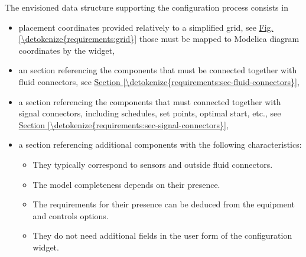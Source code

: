 \documentclass[letterpaper,10pt, openany,english]{sphinxmanual}
\begin{document}
The envisioned data structure supporting the configuration process consists in
\begin{itemize}
\item {} 
placement coordinates provided relatively to a simplified grid, see \hyperref[\detokenize{requirements:grid}]{Fig.\@ \ref{\detokenize{requirements:grid}}} \textendash{} those must be mapped to Modelica diagram coordinates by the widget,

\item {} 
an  section referencing the components that must be connected together with fluid connectors, see \hyperref[\detokenize{requirements:sec-fluid-connectors}]{Section \ref{\detokenize{requirements:sec-fluid-connectors}}},

\item {} 
a  section referencing the components that must connected together with signal connectors, including schedules, set points, optimal start, etc., see \hyperref[\detokenize{requirements:sec-signal-connectors}]{Section \ref{\detokenize{requirements:sec-signal-connectors}}},

\item {} 
a  section referencing additional components with the following characteristics:
\begin{itemize}
\item {} 
They typically correspond to sensors and outside fluid connectors.

\item {} 
The model completeness depends on their presence.

\item {} 
The requirements for their presence can be deduced from the equipment and controls options.

\item {} 
They do not need additional fields in the user form of the configuration widget.

\end{itemize}

\end{itemize}
\end{document}
